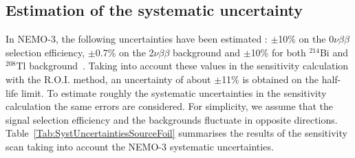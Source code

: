 \documentclass[main.tex]{subfiles}
\begin{document}






\subsection{Estimation of the systematic uncertainty}


\NI In NEMO-3, the following uncertainties have been estimated : $\pm$10\% on the 0$\nu\beta\beta$ selection efficiency, $\pm$0.7\% on the 2$\nu\beta\beta$ background and $\pm$10\% for both $^{\text{214}}$Bi and $^{\text{208}}$Tl background~\cite{NEMO3:Mo100}. Taking into account these values in the sensitivity calculation with the R.O.I. method, an uncertainty of about $\pm$11\% is obtained on the half-life limit. To estimate roughly the systematic uncertainties in the sensitivity calculation the same errors are considered. For simplicity, we assume that the signal selection efficiency and the backgrounds fluctuate in opposite directions. Table~\ref{Tab:SystUncertaintiesSourceFoil} summarises the results of the sensitivity scan taking into account the NEMO-3 systematic uncertainties.
\end{document}
